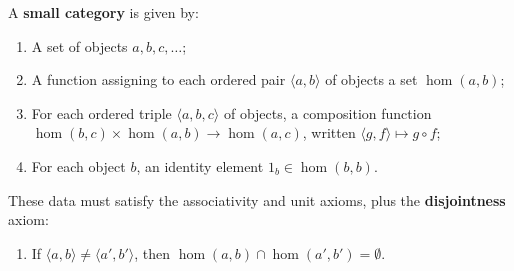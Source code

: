 A \textbf{small category} is given by:
\begin{enumerate}
\item A set of objects $a, b, c, \ldots$;
\item A function assigning to each ordered pair $\langle a, b\rangle$ of objects a set $\hom(a, b)$;
\item For each ordered triple $\langle a, b, c\rangle$ of objects, a composition function $\hom(b,c) \times \hom(a,b) \rightarrow \hom(a,c)$, written $\langle g, f\rangle \mapsto g \circ f$;
\item For each object $b$, an identity element $1_b \in \hom(b, b)$.
\end{enumerate}
These data must satisfy the associativity and unit axioms, plus the \textbf{disjointness} axiom:
\begin{enumerate}
\item[(v)] If $\langle a, b\rangle \neq \langle a', b'\rangle$, then $\hom(a, b) \cap \hom(a', b') = \emptyset$.
\end{enumerate}